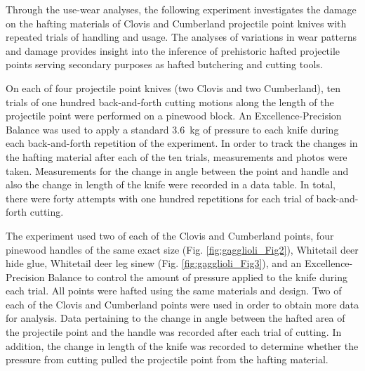 


Through the use-wear analyses, the following experiment investigates the damage on the hafting materials of Clovis and Cumberland projectile point knives with repeated trials of handling and usage. The analyses of variations in wear patterns and damage provides insight into the inference of prehistoric hafted projectile points serving secondary purposes as hafted butchering and cutting tools. 

On each of four projectile point knives (two Clovis and two Cumberland), ten trials of one hundred back-and-forth cutting motions along the length of the projectile point were performed on a pinewood block. An Excellence-Precision Balance was used to apply a standard \SI{3.6}{\kilogram} of pressure to each knife during each back-and-forth repetition of the experiment. In order to track the changes in the hafting material after each of the ten trials, measurements and photos were taken. Measurements for the change in angle between the point and handle and also the change in length of the knife were recorded in a data table. In total, there were forty attempts with one hundred repetitions for each trial of back-and-forth cutting. 

The  experiment used two of each of the Clovis and Cumberland points, four pinewood handles of the same exact size (Fig. \ref{fig:gagglioli_Fig2}), Whitetail deer hide glue, Whitetail deer leg sinew (Fig. \ref{fig:gagglioli_Fig3}), and an Excellence-Precision Balance to control the amount of pressure applied to the knife during each trial. All points were hafted using the same materials and design. Two of each of the Clovis and Cumberland points were used in order to obtain more data for analysis. Data pertaining to the change in angle between the hafted area of the projectile point and the handle was recorded after each trial of cutting. In addition, the change in length of the knife was recorded to determine whether the pressure from cutting pulled the projectile point from the hafting material.



